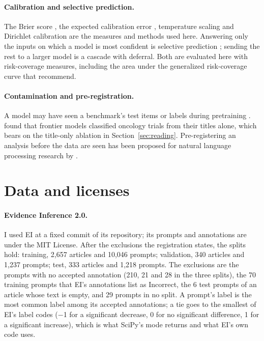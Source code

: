 \documentclass[11pt,letterpaper]{article}
\begin{document}
\paragraph{Calibration and selective prediction.} The Brier score \citep{brier1950}, the expected calibration error \citep{naeini2015}, temperature scaling \citep{guo2017} and Dirichlet calibration \citep{kull2019} are the measures and methods used here. Answering only the inputs on which a model is most confident is selective prediction \citep{geifman2017}; sending the rest to a larger model is a cascade with deferral. Both are evaluated here with risk-coverage measures, including the area under the generalized risk-coverage curve that \citet{traub2024} recommend.

\paragraph{Contamination and pre-registration.} A model may have seen a benchmark's test items or labels during pretraining \citep{sainz2023}. \citet{windisch2026} found that frontier models classified oncology trials from their titles alone, which bears on the title-only ablation in Section~\ref{sec:reading}. Pre-registering an analysis before the data are seen has been proposed for natural language processing research by \citet{vanmiltenburg2021}.

\section{Data and licenses}
\label{sec:data}

\paragraph{Evidence Inference 2.0.} I used EI at a fixed commit of its repository; its prompts and annotations are under the MIT License. After the exclusions the registration states, the splits hold: training, 2,657 articles and 10,046 prompts; validation, 340 articles and 1,237 prompts; test, 333 articles and 1,218 prompts. The exclusions are the prompts with no accepted annotation (210, 21 and 28 in the three splits), the 70 training prompts that EI's annotations list as Incorrect, the 6 test prompts of an article whose text is empty, and 29 prompts in no split. A prompt's label is the most common label among its accepted annotations; a tie goes to the smallest of EI's label codes ($-$1 for a significant decrease, 0 for no significant difference, 1 for a significant increase), which is what SciPy's mode returns and what EI's own code uses.
\end{document}
